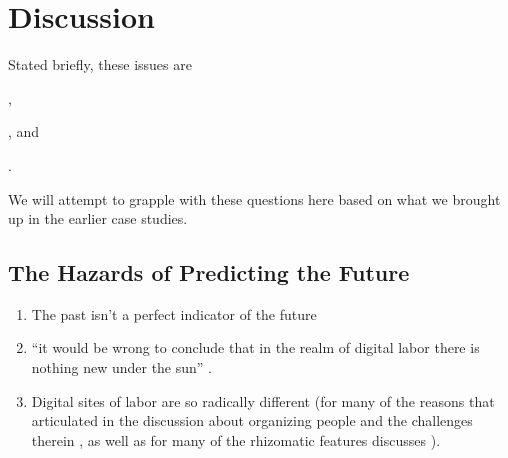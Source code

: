 \documentclass[trackingWork]{subfiles}
\begin{document}
\section{Discussion}
Stated briefly, these issues are 
\begin{inlinelist}
  \item {},
  \item {}, and
  \item {}.
\end{inlinelist}
We will attempt to grapple with these questions here based on
what we brought up in the earlier case studies.


\subsection{The Hazards of Predicting the Future}\label{sec:perilousProblemsPredicting}
\begin{enumerate}
  \item The past isn't a perfect indicator of the future
  \item ``it would be wrong to conclude that
        in the realm of digital labor
        there is nothing new under the sun''
        \cite{scholz2012digital}.
  \item Digital sites of labor are so radically different
        (for many of the reasons that \DO
        articulated in the discussion about
        organizing people and the challenges therein
        \cite{dynamo}, as well as for
        many of the rhizomatic features \citeauthor{miller2011understanding}
        discusses
        \cite{miller2011understanding}).
\end{enumerate}
\end{document}
